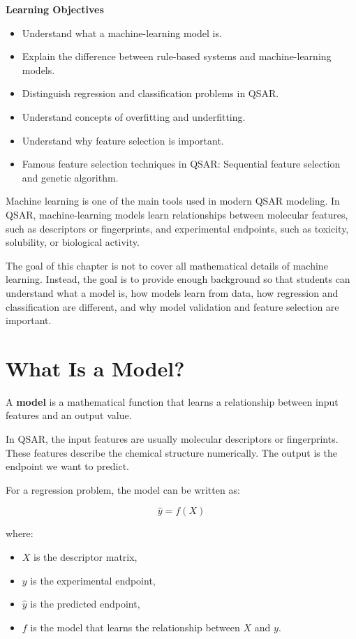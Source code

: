 \documentclass[11pt]{report}
\newenvironment{Important note}{\begin{quote}\color{red}\textbf{Important note:} }{\end{quote}}
\newenvironment{learningobjectives}
{\vspace{0.5em}\noindent\textbf{Learning Objectives}\begin{itemize}[leftmargin=*]}
{\end{itemize}\vspace{0.5em}}
\begin{document}
\begin{learningobjectives}
    \item Understand what a machine-learning model is.
    \item Explain the difference between rule-based systems and machine-learning models.
    \item Distinguish regression and classification problems in QSAR.
    \item Understand concepts of overfitting and underfitting.
    \item Understand why feature selection is important.
    \item Famous feature selection techniques in QSAR: Sequential feature selection and genetic algorithm.
\end{learningobjectives}

Machine learning is one of the main tools used in modern QSAR modeling. In QSAR, machine-learning models learn relationships between molecular features, such as descriptors or fingerprints, and experimental endpoints, such as toxicity, solubility, or biological activity.

The goal of this chapter is not to cover all mathematical details of machine learning. Instead, the goal is to provide enough background so that students can understand what a model is, how models learn from data, how regression and classification are different, and why model validation and feature selection are important.

\section{What Is a Model?}

A \textbf{model} is a mathematical function that learns a relationship between input features and an output value.

In QSAR, the input features are usually molecular descriptors or fingerprints. These features describe the chemical structure numerically. The output is the endpoint we want to predict.

For a regression problem, the model can be written as:

\[
\hat{y} = f(X)
\]

where:

\begin{itemize}[leftmargin=*]
    \item $X$ is the descriptor matrix,
    \item $y$ is the experimental endpoint,
    \item $\hat{y}$ is the predicted endpoint,
    \item $f$ is the model that learns the relationship between $X$ and $y$.
\end{itemize}
\end{document}
